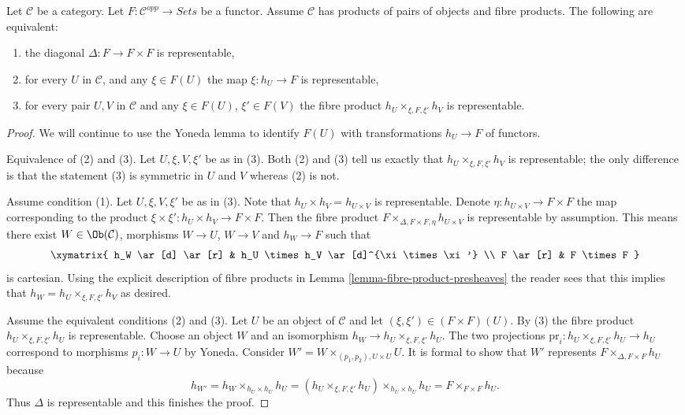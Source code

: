 \begin{lemma}
\label{lemma-representable-diagonal}
Let $\mathcal{C}$ be a category.
Let $F : \mathcal{C}^{opp} \to \textit{Sets}$ be a functor.
Assume $\mathcal{C}$ has products of pairs of objects and fibre products.
The following are equivalent:
\begin{enumerate}
\item the diagonal $\Delta : F \to F \times F$ is representable,
\item for every $U$ in $\mathcal{C}$,
and any $\xi \in F(U)$ the map $\xi : h_U \to F$ is representable,
\item for every pair $U, V$ in $\mathcal{C}$
and any $\xi \in F(U)$, $\xi' \in F(V)$ the fibre product
$h_U \times_{\xi, F, \xi'} h_V$ is representable.
\end{enumerate}
\end{lemma}

\begin{proof}
We will continue to use the Yoneda lemma to identify $F(U)$
with transformations $h_U \to F$ of functors.

\medskip\noindent
Equivalence of (2) and (3). Let $U, \xi, V, \xi'$ be as in (3).
Both (2) and (3) tell us exactly that $h_U \times_{\xi, F, \xi'} h_V$
is representable; the only difference is that the statement
(3) is symmetric in $U$ and $V$ whereas (2) is not.

\medskip\noindent
Assume condition (1). Let $U, \xi, V, \xi'$
be as in (3). Note that $h_U \times h_V = h_{U \times V}$ is representable.
Denote $\eta : h_{U \times V} \to F \times F$ the map
corresponding to the product $\xi \times \xi' : h_U \times h_V \to F \times F$.
Then the fibre product $F \times_{\Delta, F \times F, \eta} h_{U \times V}$
is representable by assumption. This means there exist
$W \in \Ob(\mathcal{C})$, morphisms
$W \to U$, $W \to V$ and $h_W \to F$ such that
$$
\xymatrix{
h_W \ar[d] \ar[r] & h_U \times h_V \ar[d]^{\xi \times \xi'} \\
F \ar[r] & F \times F
}
$$
is cartesian. Using the explicit description of fibre products
in Lemma \ref{lemma-fibre-product-presheaves} the reader sees that this
implies that $h_W = h_U \times_{\xi, F, \xi'} h_V$ as desired.

\medskip\noindent
Assume the equivalent conditions (2) and (3). Let $U$ be an object
of $\mathcal{C}$ and let $(\xi, \xi') \in (F \times F)(U)$.
By (3) the fibre product $h_U \times_{\xi, F, \xi'} h_U$ is
representable. Choose an object $W$ and an isomorphism
$h_W \to h_U \times_{\xi, F, \xi'} h_U$. The two projections
$\text{pr}_i : h_U \times_{\xi, F, \xi'} h_U \to h_U$
correspond to morphisms $p_i : W \to U$ by Yoneda. Consider
$W' = W \times_{(p_1, p_2), U \times U} U$. It is formal
to show that $W'$ represents $F \times_{\Delta, F \times F} h_U$
because
$$
h_{W'} =  h_W \times_{h_U \times h_U} h_U
= (h_U \times_{\xi, F, \xi'} h_U) \times_{h_U \times h_U} h_U
= F \times_{F \times F} h_U.
$$
Thus $\Delta$ is representable and this finishes the proof.
\end{proof}









